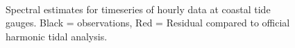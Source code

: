 


\begin{figure}[!h]
	\centering
	 \\
	\caption{Spectral estimates for timeseries of hourly data at coastal tide gauges.   Black = observations, Red = Residual compared to official harmonic tidal analysis. }
    \label{fig:SPECTRA_EG}
\end{figure}



